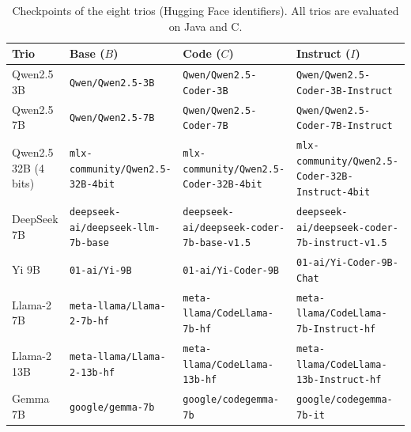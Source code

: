 \begin{table}[H]
  \caption{Checkpoints of the eight trios (Hugging Face identifiers). All trios are evaluated on Java and C.}
  \label{tab:app-models}
  \footnotesize
  \begin{tabular}{llll}
    \toprule
    Trio & Base ($B$) & Code ($C$) & Instruct ($I$) \\
    \midrule
    Qwen2.5 3B & \texttt{Qwen/Qwen2.5-3B} & \texttt{Qwen/Qwen2.5-Coder-3B} & \texttt{Qwen/Qwen2.5-Coder-3B-Instruct} \\
    Qwen2.5 7B & \texttt{Qwen/Qwen2.5-7B} & \texttt{Qwen/Qwen2.5-Coder-7B} & \texttt{Qwen/Qwen2.5-Coder-7B-Instruct} \\
    Qwen2.5 32B (4 bits) & \texttt{mlx-community/Qwen2.5-32B-4bit} & \texttt{mlx-community/Qwen2.5-Coder-32B-4bit} & \texttt{mlx-community/Qwen2.5-Coder-32B-Instruct-4bit} \\
    DeepSeek 7B & \texttt{deepseek-ai/deepseek-llm-7b-base} & \texttt{deepseek-ai/deepseek-coder-7b-base-v1.5} & \texttt{deepseek-ai/deepseek-coder-7b-instruct-v1.5} \\
    Yi 9B & \texttt{01-ai/Yi-9B} & \texttt{01-ai/Yi-Coder-9B} & \texttt{01-ai/Yi-Coder-9B-Chat} \\
    Llama-2 7B & \texttt{meta-llama/Llama-2-7b-hf} & \texttt{meta-llama/CodeLlama-7b-hf} & \texttt{meta-llama/CodeLlama-7b-Instruct-hf} \\
    Llama-2 13B & \texttt{meta-llama/Llama-2-13b-hf} & \texttt{meta-llama/CodeLlama-13b-hf} & \texttt{meta-llama/CodeLlama-13b-Instruct-hf} \\
    Gemma 7B & \texttt{google/gemma-7b} & \texttt{google/codegemma-7b} & \texttt{google/codegemma-7b-it} \\
    \bottomrule
  \end{tabular}
\end{table}

